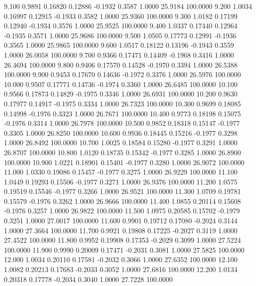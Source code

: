    9.100   0.9891   0.16820   0.12886  -0.1932   0.3587   1.0000  25.9184 100.0000
   9.200   1.0034   0.16997   0.12915  -0.1933   0.3582   1.0000  25.9360 100.0000
   9.300   1.0182   0.17199   0.12940  -0.1934   0.3576   1.0000  25.9525 100.0000
   9.400   1.0337   0.17440   0.12964  -0.1935   0.3571   1.0000  25.9686 100.0000
   9.500   1.0505   0.17773   0.12991  -0.1936   0.3565   1.0000  25.9865 100.0000
   9.600   1.0517   0.18122   0.13196  -0.1943   0.3559   1.0000  26.0058 100.0000
   9.700   0.9366   0.17471   0.14409  -0.1968   0.3416   1.0000  26.4694 100.0000
   9.800   0.9406   0.17570   0.14528  -0.1970   0.3394   1.0000  26.5388 100.0000
   9.900   0.9453   0.17670   0.14636  -0.1972   0.3376   1.0000  26.5976 100.0000
  10.000   0.9507   0.17771   0.14736  -0.1974   0.3360   1.0000  26.6485 100.0000
  10.100   0.9566   0.17873   0.14829  -0.1975   0.3346   1.0000  26.6931 100.0000
  10.200   0.9630   0.17977   0.14917  -0.1975   0.3334   1.0000  26.7323 100.0000
  10.300   0.9699   0.18085   0.14998  -0.1976   0.3323   1.0000  26.7671 100.0000
  10.400   0.9773   0.18198   0.15075  -0.1976   0.3314   1.0000  26.7978 100.0000
  10.500   0.9852   0.18318   0.15147  -0.1977   0.3305   1.0000  26.8250 100.0000
  10.600   0.9936   0.18445   0.15216  -0.1977   0.3298   1.0000  26.8492 100.0000
  10.700   1.0025   0.18584   0.15280  -0.1977   0.3291   1.0000  26.8707 100.0000
  10.800   1.0120   0.18735   0.15342  -0.1977   0.3285   1.0000  26.8900 100.0000
  10.900   1.0221   0.18901   0.15401  -0.1977   0.3280   1.0000  26.9072 100.0000
  11.000   1.0330   0.19086   0.15457  -0.1977   0.3275   1.0000  26.9229 100.0000
  11.100   1.0449   0.19293   0.15506  -0.1977   0.3271   1.0000  26.9376 100.0000
  11.200   1.0575   0.19519   0.15546  -0.1977   0.3266   1.0000  26.9521 100.0000
  11.300   1.0709   0.19781   0.15579  -0.1976   0.3262   1.0000  26.9666 100.0000
  11.400   1.0855   0.20114   0.15608  -0.1976   0.3257   1.0000  26.9822 100.0000
  11.500   1.0975   0.20585   0.15702  -0.1979   0.3251   1.0000  27.0017 100.0000
  11.600   0.9901   0.19712   0.17080  -0.2024   0.3144   1.0000  27.3664 100.0000
  11.700   0.9921   0.19808   0.17225  -0.2027   0.3119   1.0000  27.4522 100.0000
  11.800   0.9952   0.19908   0.17353  -0.2029   0.3099   1.0000  27.5224 100.0000
  11.900   0.9990   0.20009   0.17471  -0.2031   0.3081   1.0000  27.5825 100.0000
  12.000   1.0034   0.20110   0.17581  -0.2032   0.3066   1.0000  27.6352 100.0000
  12.100   1.0082   0.20213   0.17683  -0.2033   0.3052   1.0000  27.6816 100.0000
  12.200   1.0134   0.20318   0.17778  -0.2034   0.3040   1.0000  27.7228 100.0000
